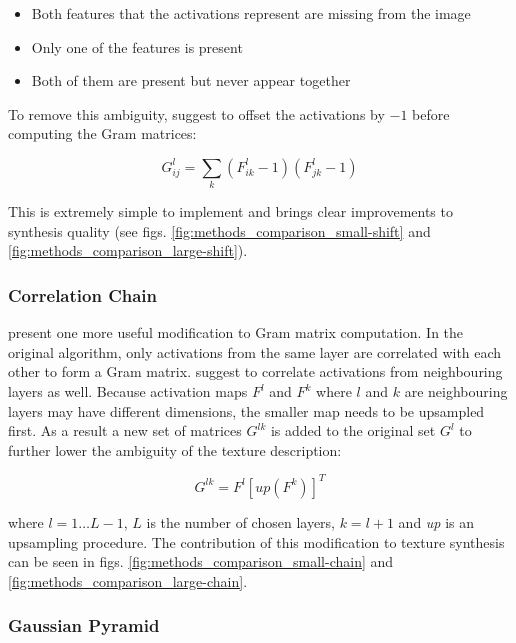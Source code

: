 \begin{itemize}
    \item Both features that the activations represent are missing from the image
    \item Only one of the features is present
    \item Both of them are present but never appear together
\end{itemize}

To remove this ambiguity, \citet{Novak2016} suggest to offset the activations by \(-1\) before computing the Gram matrices:

\begin{equation}
    \label{eq:gram_style_activation_shift}
    G_{ij}^l = \sum_k (F_{ik}^l - 1) (F_{jk}^l - 1)
\end{equation}

This is extremely simple to implement and brings clear improvements to synthesis quality (see figs. \ref{fig:methods_comparison_small-shift} and \ref{fig:methods_comparison_large-shift}).

\subsubsection{Correlation Chain}
\label{section:methods-texture_model-improvements-correlation_chain}

\citet{Novak2016} present one more useful modification to Gram matrix computation. In the original algorithm, only activations from the same layer are correlated with each other to form a Gram matrix. \citet{Novak2016} suggest to correlate activations from neighbouring layers as well. Because activation maps \(F^l\) and \(F^k\) where \(l\) and \(k\) are neighbouring layers may have different dimensions, the smaller map needs to be upsampled first. As a result a new set of matrices \(G^{lk}\) is added to the original set \(G^l\) to further lower the ambiguity of the texture description:

\begin{equation}
    \label{eq:gram_style_chain}
    G^{lk} = F^l [\textit{up}(F^k)]^T
\end{equation}

where \(l = 1 \dots L - 1\), \(L\) is the number of chosen layers, \(k = l + 1\) and \textit{up} is an upsampling procedure. The contribution of this modification to texture synthesis can be seen in figs. \ref{fig:methods_comparison_small-chain} and \ref{fig:methods_comparison_large-chain}.

\subsubsection{Gaussian Pyramid}
\label{section:methods-texture_model-improvements-gaussian_pyramid}

